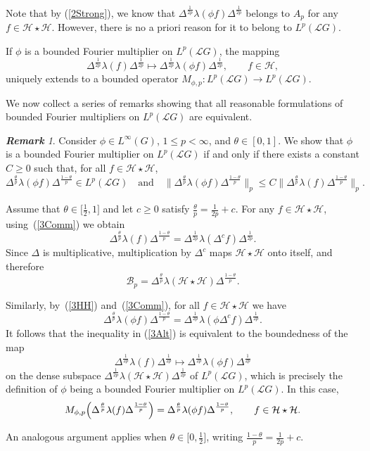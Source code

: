 \documentclass[12pt]{amsart}
\renewcommand{\H}{\mbox{${\mathcal H}$}}
\theoremstyle{remark}
\newtheorem{remark}[theorem]{\bf Remark}
\theoremstyle{definition}
\numberwithin{equation}{section}
\begin{document}
Note that by (\ref{2Strong}), we know that 
$\Delta^{\frac{1}{2p}} \lambda(\phi f) \Delta^{\frac{1}{2p}}$ belongs
to $A_p$ for any $f\in\H\star \H$. However, there is no a priori reason for it to belong to
$L^p({\mathcal L}G)$.

If $\phi$ is a bounded Fourier multiplier 
on $L^p({\mathcal L}G)$, the mapping
$$
\Delta^{\frac{1}{2p}} \lambda(f) \Delta^{\frac{1}{2p}}\mapsto
\Delta^{\frac{1}{2p}} \lambda(\phi f) \Delta^{\frac{1}{2p}},\qquad f\in \H,
$$
uniquely extends to a bounded operator
$
M_{\phi,p}\colon L^p({\mathcal L}G)\longrightarrow L^p({\mathcal L}G).
$

We now collect a series of remarks showing that all reasonable formulations of bounded Fourier multipliers on $L^p({\mathcal L}G)$ are equivalent.

\begin{remark}\label{3Theta}
Consider $\phi\in L^\infty(G)$, $1\le p<\infty$, and $\theta\in[0,1]$. 
We show that $\phi$ is a bounded Fourier multiplier on $L^p({\mathcal L}G)$
if and only if there exists a constant $C\ge 0$ such that, for all
$f\in\H\star\H$,
\begin{equation}\label{3Alt}
\Delta^{\frac{\theta}{p}} \lambda(\phi f) \Delta^{\frac{1-\theta}{p}}
\in L^p({\mathcal L}G)
\quad\text{and}\quad
\bigl\|
\Delta^{\frac{\theta}{p}} \lambda(\phi f) \Delta^{\frac{1-\theta}{p}}
\bigr\|_p
\le C
\bigl\|
\Delta^{\frac{\theta}{p}} \lambda(f) \Delta^{\frac{1-\theta}{p}}
\bigr\|_p.
\end{equation}

Assume that $\theta\in\bigl[\frac12,1\bigr]$ and let
$c\ge 0$ satisfy $\frac{\theta}{p}=\frac{1}{2p}+c$. 
For any $f\in\H\star\H$, using~(\ref{3Comm}) we obtain
\[
\Delta^{\frac{\theta}{p}}\lambda(f)\Delta^{\frac{1-\theta}{p}}
=
\Delta^{\frac{1}{2p}}\lambda(\Delta^c f)\Delta^{\frac{1}{2p}}.
\]
Since $\Delta$ is multiplicative, 
multiplication by $\Delta^c$ maps
$\H\star\H$ onto itself, and therefore
\[
{\mathcal B}_p
=
\Delta^{\frac{\theta}{p}} \lambda(\H\star\H) \Delta^{\frac{1-\theta}{p}}.
\]

Similarly, by~(\ref{3HH}) and~(\ref{3Comm}), for all $f\in\H\star\H$ we have
\[
\Delta^{\frac{\theta}{p}}\lambda(\phi f)\Delta^{\frac{1-\theta}{p}}
=
\Delta^{\frac{1}{2p}}\lambda(\phi\Delta^c f)\Delta^{\frac{1}{2p}}.
\]
It follows that the  inequality in (\ref{3Alt})
is equivalent to the boundedness of the map
\[
\Delta^{\frac{1}{2p}}\lambda(f)\Delta^{\frac{1}{2p}}
\longmapsto
\Delta^{\frac{1}{2p}}\lambda(\phi f)\Delta^{\frac{1}{2p}}
\]
on the dense subspace $\Delta^{\frac{1}{2p}}\lambda(\H\star\H)\Delta^{\frac{1}{2p}}$
of $L^p({\mathcal L}G)$, which is precisely the definition of $\phi$ being
a bounded Fourier multiplier on $L^p({\mathcal L}G)$. In this case,
\[
M_{\phi,p}\Bigl(
\Delta^{\frac{\theta}{p}} \lambda(f) \Delta^{\frac{1-\theta}{p}}
\Bigr)
=
\Delta^{\frac{\theta}{p}} \lambda(\phi f) \Delta^{\frac{1-\theta}{p}},
\qquad f\in\H\star\H.
\]

An analogous argument applies when $\theta\in\bigl[0,\frac12\bigr]$,
writing $\frac{1-\theta}{p}=\frac{1}{2p}+c$.
\end{remark}
\end{document}
